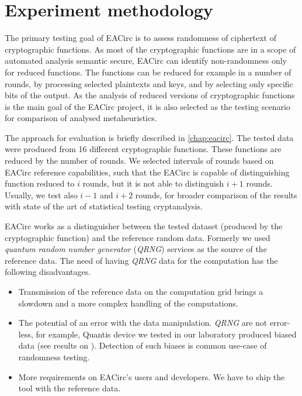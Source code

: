 \documentclass[
    digital,    %
    oneside,    %
    color,
    11pt,
    nocover,
    notable,
    nolof,
    nolot,
]{fithesis3}
\begin{document}
\chapter{Experiment methodology}
\label{chap:method}

The primary testing goal of EACirc is to assess randomness of ciphertext of cryptographic functions. As most of the cryptographic functions are in a scope of automated analysis semantic secure, EACirc can identify non-randomness only for reduced functions. The functions can be reduced for example in a number of rounds, by processing selected plaintexts and keys, and by selecting only specific bits of the output. As the analysis of reduced versions of cryptographic functions is the main goal of the EACirc project, it is also selected as the testing scenario for comparison of analysed metaheuristics.

The approach for evaluation is briefly described in \cref{chap:eacirc}. The tested data were produced from 16 different cryptographic functions. These functions are reduced by the number of rounds. We selected intervals of rounds based on EACirc reference capabilities, such that the EACirc is capable of distinguishing function reduced to $i$ rounds, but it is not able to distinguish $i+1$ rounds. Usually, we test also $i-1$ and $i+2$ rounds, for broader comparison of the results with state of the art of statistical testing cryptanalysis.

EACirc works as a distinguisher between the tested dataset (produced by the cryptographic function) and the reference random data. Formerly we used \textit{quantum random number generator} (\textit{QRNG}) services as the source of the reference data. The need of having \textit{QRNG} data for the computation has the following disadvantages.

\begin{itemize}
    \item Transmission of the reference data on the computation grid brings a slowdown and a more complex handling of the computations.
    \item The potential of an error with the data manipulation. \textit{QRNG} are not error-less, for example, Quantis device we tested in our laboratory produced biased data (see results on \cite{rttquantis}). Detection of such biases is common use-case of randomness testing.
    \item More requirements on EACirc's users and developers. We have to ship the tool with the reference data.
\end{itemize}
\end{document}
